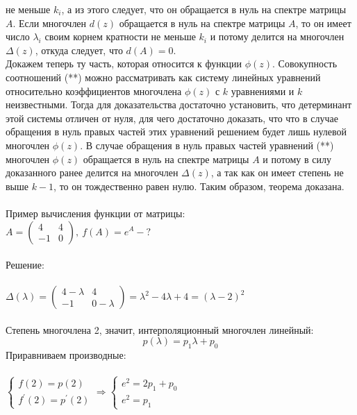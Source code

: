 \documentclass[14pt]{extarticle}
\begin{document}
не меньше $k_i$, а из этого следует, что он обращается в нуль на спектре 
матрицы $A$. Если многочлен $d(z)$ обращается в нуль на спектре матрицы $A$, 
то он имеет число $\lambda_i$ своим корнем кратности не меньше $k_i$ и потому
делится на многочлен $\Delta(z)$, откуда следует, что $d(A) = 0$. \\
Докажем теперь ту часть, которая относится к функции $\phi(z)$. Совокупность 
соотношений (**) можно рассматривать как систему линейных уравнений относительно
коэффициентов многочлена $\phi(z)$ с $k$ уравнениями и $k$ неизвестными. Тогда
для доказательства достаточно установить, что детерминант этой системы отличен
от нуля, для чего достаточно доказать, что что в случае обращения в нуль 
правых частей этих уравнений решением будет лишь нулевой многочлен $\phi(z)$.
В случае обращения в нуль правых частей уравнений (**) многочлен $\phi(z)$
обращается в нуль на спектре матрицы $A$ и потому в силу доказанного ранее 
делится на многочлен $\Delta(z)$, а так как он имеет степень не выше $k-1$, 
то он тождественно равен нулю. Таким образом, теорема доказана.\\
\\
Пример вычисления функции от матрицы:\\
$A = \begin{pmatrix}
    4 & 4\\ 
    -1 & 0
  \end{pmatrix}, \ f(A) = e^A - ?$\\\\
Решение:\\\\
$\Delta(\lambda) =\begin{pmatrix}
    4 - \lambda & 4\\ 
    -1 & 0 - \lambda
  \end{pmatrix} = \lambda^2 - 4\lambda + 4 = (\lambda-2)^2$\\\\
  Степень многочлена 2, значит, интерполяционный многочлен линейный:
  $$ p(\lambda) = p_1\lambda + p_0 $$
  Приравниваем производные: \\\\
  $\begin{cases}
    f(2) = p(2)\\
    f^{'}(2) = p^{'}(2)
  \end{cases} \Rightarrow 
  \begin{cases}
    e^2 = 2p_1 + p_0\\
    e^2 = p_1
  \end{cases}$\\\\\\
\end{document}
